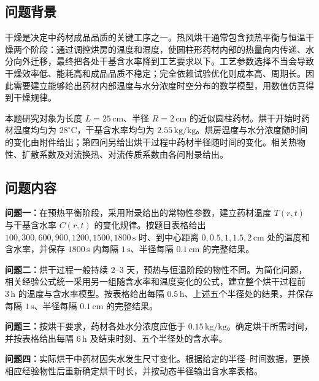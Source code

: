 \subsection{问题背景}

干燥是决定中药材成品品质的关键工序之一。热风烘干通常包含预热平衡与恒温干燥两个阶段：通过调控烘房的温度和湿度，使圆柱形药材内部的热量向内传递、水分向外迁移，最终把各处干基含水率降到工艺要求以下。工艺参数选择不当会导致干燥效率低、能耗高和成品品质不稳定；完全依赖试验优化则成本高、周期长。因此需要建立能够给出药材内部温度与水分浓度时空分布的数学模型，用数值仿真得到干燥规律。

本题研究对象为长度 $L=25\,\mathrm{cm}$、半径 $R=2\,\mathrm{cm}$ 的近似圆柱药材。烘干开始时药材温度均匀为 $28^\circ\mathrm{C}$，干基含水率均匀为 $2.55\,\mathrm{kg/kg}$。烘房温度与水分浓度随时间的变化由附件给出；第四问另给出烘干过程中药材半径随时间的变化。相关热物性、扩散系数及对流换热、对流传质系数由各问附录给出。

\subsection{问题内容}

\textbf{问题一：}在预热平衡阶段，采用附录给出的常物性参数，建立药材温度 $T(r,t)$ 与干基含水率 $C(r,t)$ 的变化规律。按题目表格给出 $100,300,600,900,1200,1500,1800\,\mathrm{s}$ 时、到中心距离 $0,0.5,1,1.5,2\,\mathrm{cm}$ 处的温度和含水率，并保存 $1800\,\mathrm{s}$ 内每隔 $1\,\mathrm{s}$、半径每隔 $0.1\,\mathrm{cm}$ 的完整结果。

\textbf{问题二：}烘干过程一般持续 $2$--$3$ 天，预热与恒温阶段的物性不同。为简化问题，相关经验公式统一采用另一组随含水率和温度变化的公式，建立整个烘干过程前 $3\,\mathrm{h}$ 的温度与含水率模型。按表格给出每隔 $0.5\,\mathrm{h}$、上述五个半径处的结果，并保存每隔 $1\,\mathrm{s}$、半径每隔 $0.1\,\mathrm{cm}$ 的完整结果。

\textbf{问题三：}按烘干要求，药材各处水分浓度应低于 $0.15\,\mathrm{kg/kg}$。确定烘干所需时间，并按表格给出每隔 $6\,\mathrm{h}$ 及结束时刻、五个半径处的含水率。

\textbf{问题四：}实际烘干中药材因失水发生尺寸变化。根据给定的半径--时间数据，更换相应经验物性后重新确定烘干时长，并按动态半径输出含水率表格。
